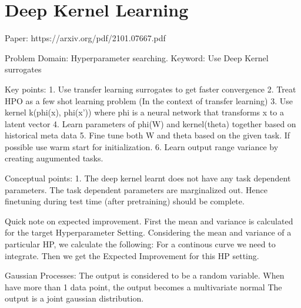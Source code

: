 \documentclass[11pt]{report}
\begin{document}

\section{Deep Kernel Learning}

\iffalse
Paper: https://arxiv.org/pdf/2101.07667.pdf

Problem Domain: Hyperparameter searching.
Keyword: Use Deep Kernel surrogates

Key points:
    1. Use transfer learning surrogates to get faster convergence
    2. Treat HPO as a few shot learning problem (In the context of transfer learning)
    3. Use kernel k(phi(x), phi(x')) where phi is a neural network that transforms x to a latent vector
    4. Learn parameters of phi(W) and kernel(theta) together based on historical meta data
    5. Fine tune both W and theta based on the given task. If possible use warm start for initialization.
    6. Learn output range variance by creating augumented tasks.

Conceptual points:
    1. The deep kernel learnt does not have any task dependent parameters.
       The task dependent parameters are marginalized out.
       Hence finetuning during test time (after pretraining) should be complete.

Quick note on expected improvement.
    First the mean and variance is calculated for the target Hyperparameter Setting.
    Considering the mean and variance of a particular HP, we calculate the following:
        For a continous curve we need to integrate.
    Then we get the Expected Improvement for this HP setting.


Gaussian Processes:
    The output is considered to be a random variable.
    When have more than 1 data point, the output becomes a multivariate normal
        The output is a joint gaussian distribution.
\end{document}
